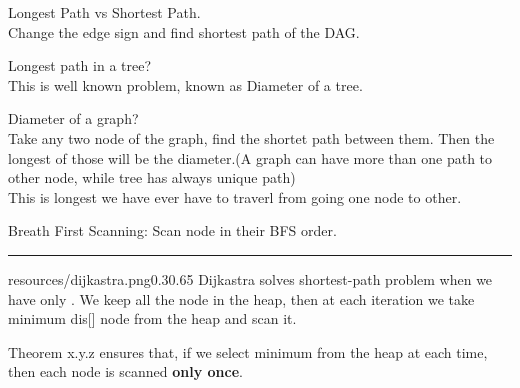 Longest Path vs Shortest Path.\\
Change the edge sign and find shortest path of the DAG.

Longest path in a tree?\\
This is well known problem, known as Diameter of a tree.


Diameter of a graph?\\
Take any two node of the graph, find the shortet path between them. Then the longest of those will be the diameter.(A graph can have more than one path to other node, while tree has always unique path)
\\This is longest we have ever have to traverl from going one node to other.

Breath First Scanning: Scan node in their BFS order.

\rule{\linewidth}{0.2em}

\begin{lfigure}{resources/dijkastra.png}{0.3}{0.65}
    Dijkastra solves shortest-path problem when we have only .
    We keep all the node in the heap, then at each iteration we take minimum dis[] node from the heap and scan it.

    Theorem x.y.z ensures that, if we select minimum from the heap at each time, then each node is scanned \textbf{only once}.
\end{lfigure}

